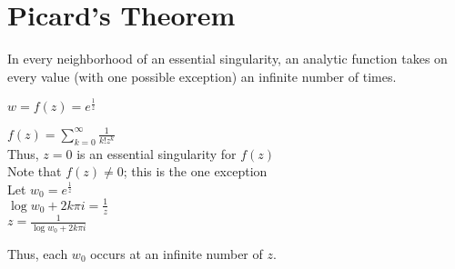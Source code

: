 \documentclass[letterpaper,12pt,fleqn]{article}
\begin{document}
\section*{Picard's Theorem}

\begin{theorem}
  In every neighborhood of an essential singularity, an analytic function
  takes on every value (with one possible exception) an infinite number of
  times.
\end{theorem}

\begin{example}
  $w=f(z)=e^{\frac{1}{z}}$

  $f(z)=\sum_{k=0}^{\infty}\frac{1}{k!z^k}$ \\
  Thus, $z=0$ is an essential singularity for $f(z)$ \\
  Note that $f(z)\ne0$; this is the one exception \\
  Let $w_0=e^{\frac{1}{z}}$ \\
  $\log{w_0}+2k\pi i=\frac{1}{z}$ \\
  $z=\frac{1}{\log{w_0}+2k\pi i}$

  Thus, each $w_0$ occurs at an infinite number of $z$.
\end{example}
\end{document}

